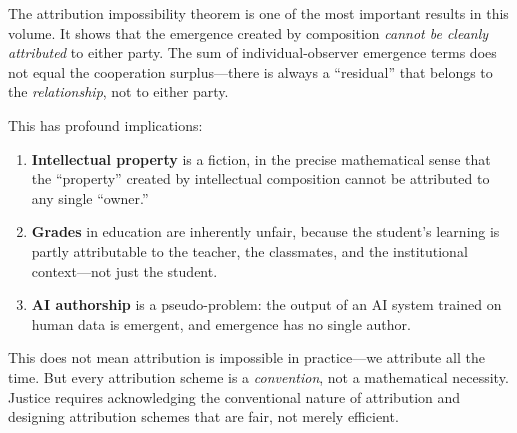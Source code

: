 \begin{interpretation}
The attribution impossibility theorem is one of the most important results in
this volume. It shows that the emergence created by composition \emph{cannot be
cleanly attributed} to either party. The sum of individual-observer emergence
terms does not equal the cooperation surplus---there is always a ``residual''
that belongs to the \emph{relationship}, not to either party.

This has profound implications:
\begin{enumerate}
\item \textbf{Intellectual property} is a fiction, in the precise mathematical
sense that the ``property'' created by intellectual composition cannot be
attributed to any single ``owner.''
\item \textbf{Grades} in education are inherently unfair, because the student's
learning is partly attributable to the teacher, the classmates, and the
institutional context---not just the student.
\item \textbf{AI authorship} is a pseudo-problem: the output of an AI system
trained on human data is emergent, and emergence has no single author.
\end{enumerate}

This does not mean attribution is impossible in practice---we attribute all the
time. But every attribution scheme is a \emph{convention}, not a mathematical
necessity. Justice requires acknowledging the conventional nature of attribution
and designing attribution schemes that are fair, not merely efficient.
\end{interpretation}


